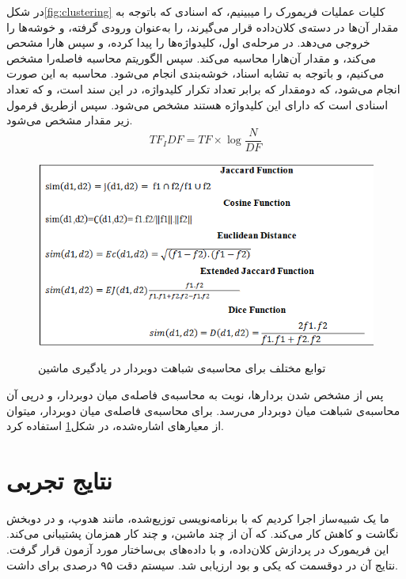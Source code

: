 \documentclass[12pt,onecolumn,a4paper]{article}
\begin{document}
در شکل\ref{fig:clustering} کلیات عملیات فریمورک را میبینیم، که اسنادی که باتوجه به مقدار آن‌ها در دسته‌ی کلان‌داده قرار می‌گیرند، را به‌عنوان ورودی گرفته، و خوشه‌ها را خروجی می‌دهد.
در مرحله‌ی اول، کلیدواژه‌ها را پیدا کرده، و سپس هارا مشحص می‌کند، و مقدار  آن‌هارا محاسبه می‌کند. سپس الگوریتم محاسبه فاصله‌را مشخص می‌کنیم، و باتوجه به تشابه اسناد، خوشه‌بندی انجام می‌شود.
محاسبه  به این صورت انجام می‌شود، که دومقدار  که برابر تعداد تکرار کلیدواژه، در این سند است، و  که تعداد اسنادی است که دارای این کلیدواژه هستند مشخص می‌شود.
سپس ازطریق فرمول زیر مقدار  مشخص می‌شود.  \\

\begin{equation}
    TF_IDF=TF \times \log \dfrac{N}{DF}
\end{equation}

\begin{figure}[h!]
    \centering
    \includegraphics[width=1\textwidth]{distance.png}
    \label{fig:distance}
    \caption{توابع مختلف برای محاسبه‌ی شباهت دوبردار در یادگیری ماشین}
\end{figure}

پس از مشخص شدن بردارها، نوبت به محاسبه‌ی فاصله‌ی میان دوبردار، و درپی آن محاسبه‌ی شباهت میان دوبردار می‌رسد. برای محاسبه‌ی فاصله‌ی میان دوبردار، میتوان از معیارهای اشاره‌شده، در شکل\ref{fig:distance} استفاده کرد.


\section{نتایج تجربی}
ما یک شبیه‌ساز اجرا کردیم که با برنامه‌نویسی توزیع‌شده، مانند هدوپ، و در دوبخش نگاشت و کاهش کار می‌کند. که آن از چند ماشبن، و چند کار همزمان پشتیبانی می‌کند. این فریمورک در پردازش کلان‌داده، و با داده‌های بی‌ساختار مورد آزمون قرار گرفت.
نتایج آن در دوقسمت که یکی  و  بود ارزیابی شد. سیستم دقت ۹۵ درصدی برای  داشت.
\end{document}

